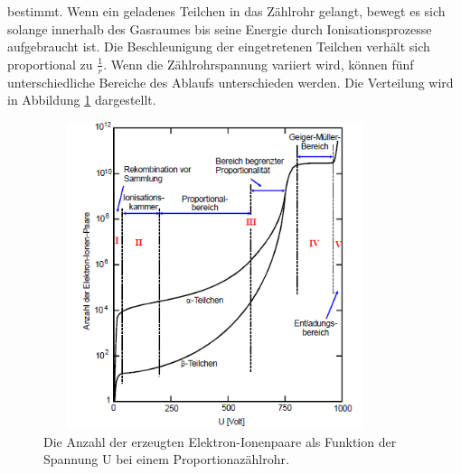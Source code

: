 bestimmt.
Wenn ein geladenes Teilchen in das Zählrohr gelangt, bewegt es sich solange innerhalb des Gasraumes bis seine Energie durch Ionisationsprozesse aufgebraucht ist.
Die Beschleunigung der eingetretenen Teilchen verhält sich proportional zu $\frac{1}{{r}}$.
Wenn die Zählrohrspannung variiert wird, können fünf unterschiedliche Bereiche des Ablaufs unterschieden werden.
Die Verteilung wird in Abbildung \ref{fig:Zählrohrcharakteristik} dargestellt.
\begin{figure}[H]
\begin{center}
\includegraphics[width = 10cm, height= 9cm]{Zählrohrcharakteristik.png}
\caption{Die Anzahl der erzeugten Elektron-Ionenpaare als Funktion der Spannung U bei einem Proportionazählrohr.\protect\cite{AL}}
\label{fig:Zählrohrcharakteristik}
\end{center}
\end{figure}
